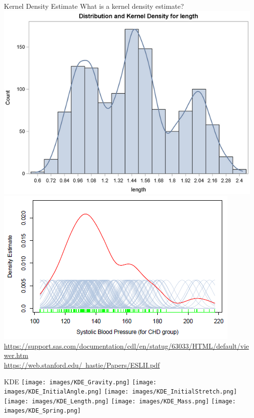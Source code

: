 \documentclass{beamer}
\begin{document}
\begin{frame}{Kernel Density Estimate}
\centering
\normalsize What is a kernel density estimate? \\
\vspace{30 pt}
\includegraphics[scale=0.3]{images/Histogram.png}
\hspace{20 pt}
\includegraphics[scale=0.45]{images/GaussianKernel.png} \\
{\tiny \href{https://support.sas.com/documentation/cdl/en/statug/63033/HTML/default/viewer.htm}{https://support.sas.com/documentation/cdl/en/statug/63033/HTML/default/viewer.htm}} \\
{\tiny \href{https://web.stanford.edu/~hastie/Papers/ESLII.pdf}{https://web.stanford.edu/~hastie/Papers/ESLII.pdf}}
\end{frame}

\begin{frame}{KDE}
\centering
\texttt{[image: images/KDE\_Gravity.png]}
\texttt{[image: images/KDE\_InitialAngle.png]}
\texttt{[image: images/KDE\_InitialStretch.png]}
\\
\vspace{10 pt}
\texttt{[image: images/KDE\_Length.png]}
\texttt{[image: images/KDE\_Mass.png]}
\texttt{[image: images/KDE\_Spring.png]}
\end{frame}
\end{document}
